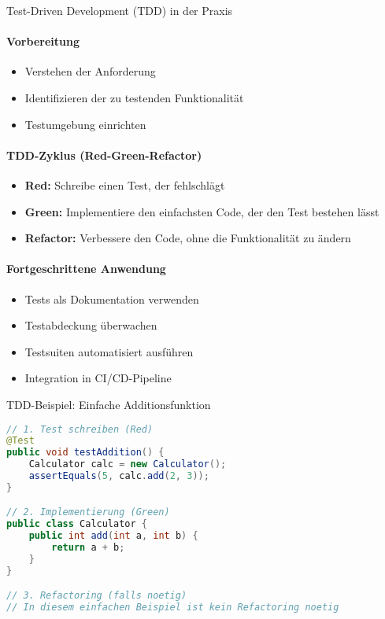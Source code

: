 \begin{KR}{Test-Driven Development (TDD) in der Praxis}\\
    \paragraph{Vorbereitung}
    \begin{itemize}
        \item Verstehen der Anforderung
        \item Identifizieren der zu testenden Funktionalität
        \item Testumgebung einrichten
    \end{itemize}
    
    \paragraph{TDD-Zyklus (Red-Green-Refactor)}
    \begin{itemize}
        \item \textbf{Red:} Schreibe einen Test, der fehlschlägt
        \item \textbf{Green:} Implementiere den einfachsten Code, der den Test bestehen lässt
        \item \textbf{Refactor:} Verbessere den Code, ohne die Funktionalität zu ändern
    \end{itemize}
    
    \paragraph{Fortgeschrittene Anwendung}
    \begin{itemize}
        \item Tests als Dokumentation verwenden
        \item Testabdeckung überwachen
        \item Testsuiten automatisiert ausführen
        \item Integration in CI/CD-Pipeline
    \end{itemize}
\end{KR}

\begin{examplecode}{TDD-Beispiel: Einfache Additionsfunktion}\\
\begin{lstlisting}[language=Java, style=basesmol]
// 1. Test schreiben (Red)
@Test
public void testAddition() {
    Calculator calc = new Calculator();
    assertEquals(5, calc.add(2, 3));
}

// 2. Implementierung (Green)
public class Calculator {
    public int add(int a, int b) {
        return a + b;
    }
}

// 3. Refactoring (falls noetig)
// In diesem einfachen Beispiel ist kein Refactoring noetig
\end{lstlisting}
\end{examplecode}